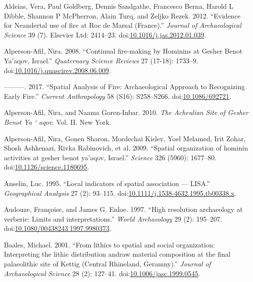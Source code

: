 \documentclass[smallextended]{svjour3}       %
\begin{document}
\hypertarget{ref-Aldeias2012}{}
Aldeias, Vera, Paul Goldberg, Dennis Sandgathe, Francesco Berna, Harold
L Dibble, Shannon P McPherron, Alain Turq, and Zeljko Rezek. 2012.
``Evidence for Neandertal use of fire at Roc de Marsal (France).''
\emph{Journal of Archaeological Science} 39 (7). Elsevier Ltd: 2414--23.
doi:\href{https://doi.org/10.1016/j.jas.2012.01.039}{10.1016/j.jas.2012.01.039}.

\hypertarget{ref-Alperson-Afil2008}{}
Alperson-Afil, Nira. 2008. ``Continual fire-making by Hominins at Gesher
Benot Ya'aqov, Israel.'' \emph{Quaternary Science Reviews} 27 (17-18):
1733--9.
doi:\href{https://doi.org/10.1016/j.quascirev.2008.06.009}{10.1016/j.quascirev.2008.06.009}.

\hypertarget{ref-Alperson-Afil2017a}{}
---------. 2017. ``Spatial Analysis of Fire: Archaeological Approach to
Recognizing Early Fire.'' \emph{Current Anthropology} 58 (S16):
S258--S266. doi:\href{https://doi.org/10.1086/692721}{10.1086/692721}.

\hypertarget{ref-Alperson-Afil2010a}{}
Alperson-Afil, Nira, and Naama Goren-Inbar. 2010. \emph{The Acheulian
Site of Gesher Benot Ya ` aqov}. Vol. II. New York.

\hypertarget{ref-Alperson-Afil2009}{}
Alperson-Afil, Nira, Gonen Sharon, Mordechai Kislev, Yoel Melamed, Irit
Zohar, Shosh Ashkenazi, Rivka Rabinovich, et al. 2009. ``Spatial
organization of hominin activities at gesher benot ya'aqov, Israel.''
\emph{Science} 326 (5960): 1677--80.
doi:\href{https://doi.org/10.1126/science.1180695}{10.1126/science.1180695}.

\hypertarget{ref-Anselin1995}{}
Anselin, Luc. 1995. ``Local indicators of spatial association ---
LISA.'' \emph{Geographical Analysis} 27 (2): 93--115.
doi:\href{https://doi.org/10.1111/j.1538-4632.1995.tb00338.x}{10.1111/j.1538-4632.1995.tb00338.x}.

\hypertarget{ref-Audouze1997}{}
Audouze, Françoise, and James G. Enloe. 1997. ``High resolution
archaeology at verberie: Limits and interpretations.'' \emph{World
Archaeology} 29 (2): 195--207.
doi:\href{https://doi.org/10.1080/00438243.1997.9980373}{10.1080/00438243.1997.9980373}.

\hypertarget{ref-Baales2001}{}
Baales, Michael. 2001. ``From lithics to spatial and social
organization: Interpreting the lithic distribution andraw material
composition at the final palaeolithic site of Kettig (Central Rhineland,
Geramny).'' \emph{Journal of Archaeological Science} 28 (2): 127--41.
doi:\href{https://doi.org/10.1006/jasc.1999.0545}{10.1006/jasc.1999.0545}.
\end{document}
